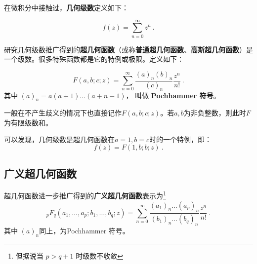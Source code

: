 

在微积分中接触过，\textbf{几何级数}定义如下：

\begin{equation}
f(z) = \sum_{n=0}^\infty z^n~.
\end{equation}

研究几何级数推广得到的\textbf{超几何函数}（或称\textbf{普通超几何函数}、\textbf{高斯超几何函数}）是一个级数。很多特殊函数都是它的特例或极限。定义如下：

\begin{equation}
F(a,b;c;z) = \sum_{n=0}^\infty \frac{(a)_n(b)_n}{(c)_n} \frac{z^n}{n!}~.
\end{equation}
其中 $(a)_n = a(a+1)\dots(a+n-1)$， 叫做 \textbf{Pochhammer 符号}。

一般在不产生歧义的情况下也直接记作$F(a,b;c;z)$。若$a,b$为非负整数，则此时$F$为有限级数和。

可以发现，几何级数是超几何函数在$a=1,b=c$时的一个特例，即：
\begin{equation}
f(z)=F(1,b;b;z)~.
\end{equation}

\subsection{广义超几何函数}

超几何函数进一步推广得到的\textbf{广义超几何函数}表示为\footnote{但据说当 $p > q+1$ 时级数不收敛}
\begin{equation}
{_pF_q}(a_1,\dots, a_p; b_1, \dots, b_q; z) = \sum_{n=0}^\infty \frac{(a_1)_n\dots (a_p)_n}{(b_1)_n\dots(b_q)_n} \frac{z^n}{n!}~.
\end{equation}
其中 $(a)_n$同上，为Pochhammer 符号。

